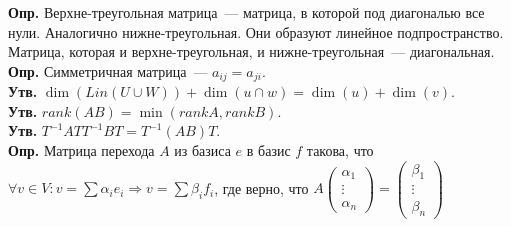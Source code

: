\documentclass{article}
\begin{document}
	\textbf{Опр.} Верхне-треугольная матрица~--- матрица, в которой под диагональю все нули. Аналогично нижне-треугольная. Они образуют линейное подпространство. Матрица, которая и верхне-треугольная, и нижне-треугольная~--- диагональная. \\
	\textbf{Опр.} Симметричная матрица~--- $a_{ij} = a_{ji}$. \\
	\textbf{Утв.} $\dim(Lin(U \cup W)) + \dim(u \cap w) = \dim(u) + \dim(v)$. \\
	\textbf{Утв.} $rank(AB) = \min(rank A, rank B)$. \\
	\textbf{Утв.} $T^{-1} A T T^{-1} B T = T^{-1} (A B) T$. \\
	\textbf{Опр.} Матрица перехода $A$ из базиса $e$ в базис $f$ такова, что $\forall v \in V: v = \sum \alpha_i e_i \Rightarrow v = \sum \beta_i f_i$, где верно, что $A
	\left( \begin{smallmatrix}
		\alpha_1 \\
		\vdots \\
		\alpha_n
	\end{smallmatrix} \right) =
	\left( \begin{smallmatrix}
		\beta_1 \\
		\vdots \\
		\beta_n
	\end{smallmatrix} \right)
	$ \\
\end{document}

